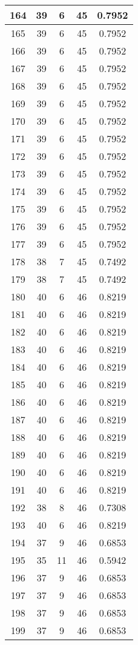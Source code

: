 \documentclass[letterpaper, 12pt]{article}
\begin{document}
\begin{longtable}{|c|c|c|c|c|}
\hline
164 & 39 & 6 & 45 & 0.7952 \\
\hline
165 & 39 & 6 & 45 & 0.7952 \\
\hline
166 & 39 & 6 & 45 & 0.7952 \\
\hline
167 & 39 & 6 & 45 & 0.7952 \\
\hline
168 & 39 & 6 & 45 & 0.7952 \\
\hline
169 & 39 & 6 & 45 & 0.7952 \\
\hline
170 & 39 & 6 & 45 & 0.7952 \\
\hline
171 & 39 & 6 & 45 & 0.7952 \\
\hline
172 & 39 & 6 & 45 & 0.7952 \\
\hline
173 & 39 & 6 & 45 & 0.7952 \\
\hline
174 & 39 & 6 & 45 & 0.7952 \\
\hline
175 & 39 & 6 & 45 & 0.7952 \\
\hline
176 & 39 & 6 & 45 & 0.7952 \\
\hline
177 & 39 & 6 & 45 & 0.7952 \\
\hline
178 & 38 & 7 & 45 & 0.7492 \\
\hline
179 & 38 & 7 & 45 & 0.7492 \\
\hline
180 & 40 & 6 & 46 & 0.8219 \\
\hline
181 & 40 & 6 & 46 & 0.8219 \\
\hline
182 & 40 & 6 & 46 & 0.8219 \\
\hline
183 & 40 & 6 & 46 & 0.8219 \\
\hline
184 & 40 & 6 & 46 & 0.8219 \\
\hline
185 & 40 & 6 & 46 & 0.8219 \\
\hline
186 & 40 & 6 & 46 & 0.8219 \\
\hline
187 & 40 & 6 & 46 & 0.8219 \\
\hline
188 & 40 & 6 & 46 & 0.8219 \\
\hline
189 & 40 & 6 & 46 & 0.8219 \\
\hline
190 & 40 & 6 & 46 & 0.8219 \\
\hline
191 & 40 & 6 & 46 & 0.8219 \\
\hline
192 & 38 & 8 & 46 & 0.7308 \\
\hline
193 & 40 & 6 & 46 & 0.8219 \\
\hline
194 & 37 & 9 & 46 & 0.6853 \\
\hline
195 & 35 & 11 & 46 & 0.5942 \\
\hline
196 & 37 & 9 & 46 & 0.6853 \\
\hline
197 & 37 & 9 & 46 & 0.6853 \\
\hline
198 & 37 & 9 & 46 & 0.6853 \\
\hline
199 & 37 & 9 & 46 & 0.6853 \\
\hline
\end{longtable}
\end{document}
